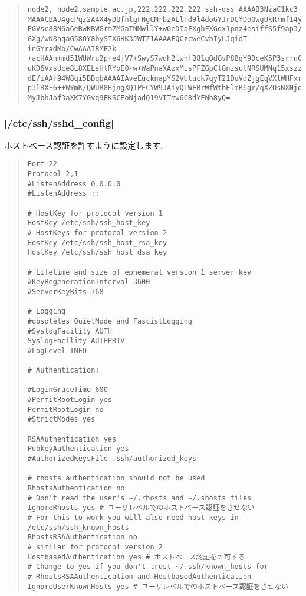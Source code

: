 \documentclass[a4paper,titlepage]{jreport}
\begin{document}
\begin{quote}
\begin{screen}
\begin{verbatim}
node2, node2.sample.ac.jp,222.222.222.222 ssh-dss AAAAB3NzaC1kc3
MAAACBAJ4gcPqz2A4X4yDUfnlgFNgCMrbzALlTd9l4doGYJrDCYDoOwgUkRrmf14yeQKct9SSX
PGVsc88N6a6eRwKBWGrm7MGaTNMwllY+w0eDIaFXgbFXGqx1pnz4esiffS5f9ap3/pVXXaoCTS
GXg/wN8hqaG58OY8bySTX6HK3JWTZ1AAAAFQCzcweCvbIyLJqidT inGYradMb/CwAAAIBMF2k
+acHAAn+md51WUWru2p+e4jV7+SwyS7wdh2lwhfB81qOdGvP8BgY9DceK5P3srrnC6ZlUt67Iy
uKD6VxsUce8L8XELsHlRYoE0+w+WaPnaXAzxMisPFZGpClGnzsutNRSUMNq15xszztqHQAhXX2
dE/iAAf94W8qi5BDqbAAAAIAveEucknapYS2VUtuck7qyT21DuVdZjgEqVXlWHFxr06mrdWq7H
p3lRXF6++WYmK/QWUR8BjngXQ1PFCYW9JAiyQIWFBrWfWtbElmR6gr/qXZOsNXNjoDxdDG5SwX
MyJbhJaf3aXK7YGvq9FKSCEoNjadQ19VITmw6C8dYFNh8yQ=
\end{verbatim}
\end{screen}
\end{quote}

\subsubsection{[/etc/ssh/sshd\_config]}

ホストベース認証を許すように設定します.

\begin{quote}
\begin{screen}
\begin{verbatim}
Port 22
Protocol 2,1
#ListenAddress 0.0.0.0
#ListenAddress ::

# HostKey for protocol version 1
HostKey /etc/ssh/ssh_host_key
# HostKeys for protocol version 2
HostKey /etc/ssh/ssh_host_rsa_key
HostKey /etc/ssh/ssh_host_dsa_key

# Lifetime and size of ephemeral version 1 server key
#KeyRegenerationInterval 3600
#ServerKeyBits 768

# Logging
#obsoletes QuietMode and FascistLogging
#SyslogFacility AUTH
SyslogFacility AUTHPRIV
#LogLevel INFO

# Authentication:

#LoginGraceTime 600
#PermitRootLogin yes
PermitRootLogin no
#StrictModes yes

RSAAuthentication yes
PubkeyAuthentication yes
#AuthorizedKeysFile	.ssh/authorized_keys

# rhosts authentication should not be used
RhostsAuthentication no
# Don't read the user's ~/.rhosts and ~/.shosts files
IgnoreRhosts yes # ユーザレベルでのホストベース認証をさせない
# For this to work you will also need host keys in /etc/ssh/ssh_known_hosts
RhostsRSAAuthentication no
# similar for protocol version 2
HostbasedAuthentication yes # ホストベース認証を許可する
# Change to yes if you don't trust ~/.ssh/known_hosts for
# RhostsRSAAuthentication and HostbasedAuthentication
IgnoreUserKnownHosts yes # ユーザレベルでのホストベース認証をさせない
\end{verbatim}
\end{screen}
\end{quote}
\end{document}
